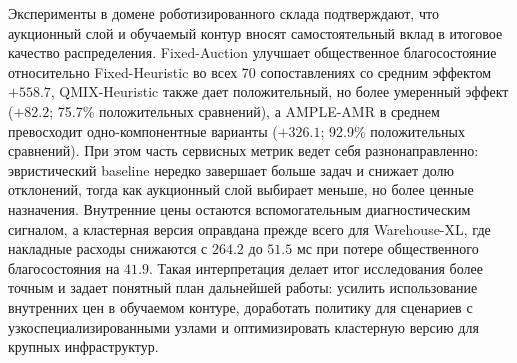 \documentclass[a4paper,14pt]{extarticle}
\begin{document}
Эксперименты в домене роботизированного склада подтверждают, что аукционный слой и обучаемый контур вносят самостоятельный вклад в итоговое качество распределения. Fixed-Auction улучшает общественное благосостояние относительно Fixed-Heuristic во всех 70 сопоставлениях со средним эффектом $+558.7$, QMIX-Heuristic также дает положительный, но более умеренный эффект ($+82.2$; 75.7\% положительных сравнений), а AMPLE-AMR в среднем превосходит одно-компонентные варианты ($+326.1$; 92.9\% положительных сравнений). При этом часть сервисных метрик ведет себя разнонаправленно: эвристический baseline нередко завершает больше задач и снижает долю отклонений, тогда как аукционный слой выбирает меньше, но более ценные назначения. Внутренние цены остаются вспомогательным диагностическим сигналом, а кластерная версия оправдана прежде всего для Warehouse-XL, где накладные расходы снижаются с $264.2$ до $51.5$ мс при потере общественного благосостояния на $41.9$. Такая интерпретация делает итог исследования более точным и задает понятный план дальнейшей работы: усилить использование внутренних цен в обучаемом контуре, доработать политику для сценариев с узкоспециализированными узлами и оптимизировать кластерную версию для крупных инфраструктур.

\begingroup
\sloppy


\endgroup
\end{document}
